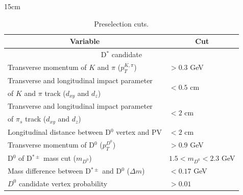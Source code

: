 \begin{table}[!htbp]{15cm}
  \caption{Preselection cuts.}
  \begin{tabular}{ l | l }
    \hline
    \multicolumn{1}{c|}{Variable}                                               & \multicolumn{1}{|c}{Cut}       \\ \hline
    \multicolumn{2}{c}{D$^*$ candidate}                                                                          \\ \hline
    Transverse momentum of $K$ and $\pi$ ($p_T^{K, \pi}$)                       & $> 0.3$ GeV                    \\ \hline
    Transverse and longitudinal impact parameter                                & \multirow[c]{2}{*}{$< 0.5$ cm} \\
    of $K$ and $\pi$ track ($d_{xy}$ and $d_z$)                                 &                                \\ \hline
    Transverse and longitudinal impact parameter                                & \multirow[c]{2}{*}{$< 2$ cm}   \\
    of $\pi_s$ track ($d_{xy}$ and $d_z$)                                       &                                \\ \hline
    Longitudinal distance between D$^0$ vertex and PV                           & $< 2$ cm                       \\ \hline
    Transverse momentum of D$^0$ ($p_T^{D^0}$)                                  & $> 0.9$ GeV                    \\ \hline
    D$^0$ of D$^{*\pm}$ mass cut ($m_{D^0}$)                                    & $1.5 < m_{D^0} < 2.3$ GeV      \\ \hline
    Mass difference between D$^{*\pm}$ and D$^0$ ($\Delta m$)                   & $< 0.17$ GeV                   \\ \hline
    $D^0$ candidate vertex probability                                          & $> 0.01$                       \\ \hline


\end{tabular}
\end{table}
